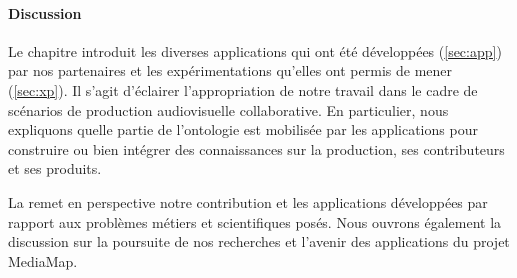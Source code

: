 

\paragraph{Discussion}

Le chapitre  introduit les diverses applications qui ont été développées (\ref{sec:app}) par nos partenaires et les expérimentations qu'elles ont permis de mener (\ref{sec:xp}).
Il s'agit d'éclairer l'appropriation de notre travail dans le cadre de scénarios de production audiovisuelle collaborative.
En particulier, nous expliquons quelle partie de l'ontologie est mobilisée par les applications pour construire ou bien intégrer des connaissances sur la production, ses contributeurs et ses produits.

La  remet en perspective notre contribution et les applications développées par rapport aux problèmes métiers et scientifiques posés.
Nous ouvrons également la discussion sur la poursuite de nos recherches et l'avenir des applications du projet MediaMap.